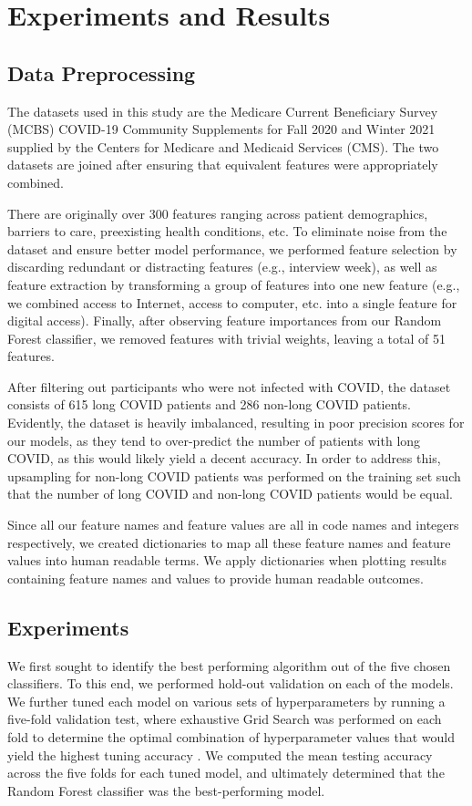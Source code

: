 \documentclass{article}
\begin{document}
\section{Experiments and Results}
\label{results}
\subsection{Data Preprocessing}
The datasets used in this study are the Medicare Current Beneficiary Survey (MCBS) COVID-19 Community Supplements for Fall 2020 and Winter 2021 supplied by the Centers for Medicare and Medicaid Services (CMS). The two datasets are joined after ensuring that equivalent features were appropriately combined.

There are originally over 300 features ranging across patient demographics, barriers to care, preexisting health conditions, etc. To eliminate noise from the dataset and ensure better model performance, we performed feature selection by discarding redundant or distracting features (e.g., interview week), as well as feature extraction by transforming a group of features into one new feature (e.g., we combined access to Internet, access to computer, etc. into a single feature for digital access). Finally, after observing feature importances from our Random Forest classifier, we removed features with trivial weights, leaving a total of 51 features.

After filtering out participants who were not infected with COVID, the dataset consists of 615 long COVID patients and 286 non-long COVID patients. Evidently, the dataset is heavily imbalanced, resulting in poor precision scores for our models, as they tend to over-predict the number of patients with long COVID, as this would likely yield a decent accuracy. In order to address this, upsampling for non-long COVID patients was performed on the training set such that the number of long COVID and non-long COVID patients would be equal.

Since all our feature names and feature values are all in code names and integers respectively, we created dictionaries to map all these feature names and feature values into human readable terms. We apply dictionaries when plotting results containing feature names and values to provide human readable outcomes. 
\subsection{Experiments}

We first sought to identify the best performing algorithm out of the five chosen classifiers. To this end, we performed hold-out validation on each of the models. We further tuned each model on various sets of hyperparameters by running a five-fold validation test, where exhaustive Grid Search was performed on each fold to determine the optimal combination of hyperparameter values that would yield the highest tuning accuracy \citep{scikit-learn}. We computed the mean testing accuracy across the five folds for each tuned model, and ultimately determined that the Random Forest classifier was the best-performing model.
\end{document}

